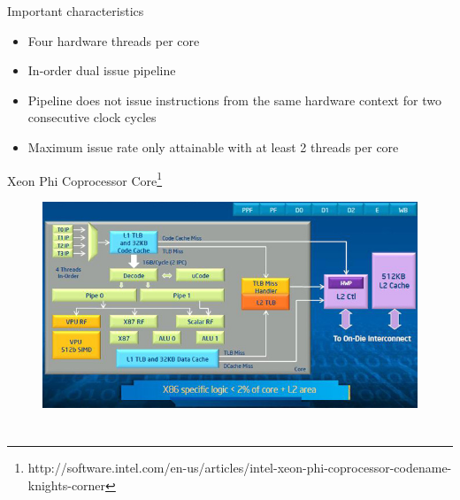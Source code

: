 \documentclass{beamer}
\begin{document}
\begin{frame}{Important characteristics}
  \begin{itemize}
    \item Four hardware threads per core
    \item In-order dual issue pipeline
    \item Pipeline does not issue instructions from the same hardware
      context for two consecutive clock cycles
    \item Maximum issue rate only attainable with at least 2 threads per
      core
  \end{itemize}
\end{frame}

\begin{frame}{Xeon Phi Coprocessor Core\footnote{http://software.intel.com/en-us/articles/intel-xeon-phi-coprocessor-codename-knights-corner}}
  \begin{center}
  \begin{figure}[htbp]
      \includegraphics[scale=.45]{img/phi_arch.jpg}
  \end{figure}
  \end{center}
\end{frame}



\section{}
\end{document}
